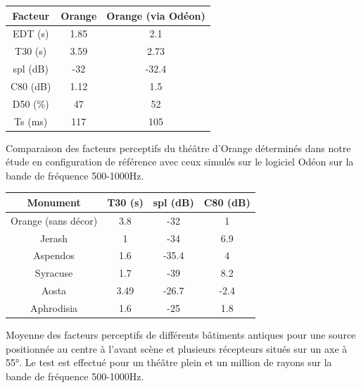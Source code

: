 %
\begin{tableth}
 \begin{tabular}{| *{3}{c|}} 
 \hline 
 Facteur & Orange & Orange (via Odéon)   \\ 
 \hline 
 \hline 
  \gls{EDT} (s)& 1.85& 2.1 \\ 
 \hline 
\gls{T30} (s)& 3.59&  2.73\\ 
 \hline 
\gls{spl} (dB) &-32 & -32.4\\ 
 \hline 
\gls{C80} (dB)& 1.12&1.5  \\ 
 \hline 
\gls{D50} (\%)&47 & 52 \\ 
 \hline 
\gls{Ts} (ms)&117 & 105 \\ 
 \hline 
\end{tabular} 
 \caption{Comparaison des facteurs perceptifs du théâtre d'Orange déterminés dans notre étude en configuration de référence avec ceux simulés sur le logiciel Odéon sur la bande de fréquence 500-1000Hz.}
 \label{tab_rindel} 
 \end{tableth}
 
 \begin{tableth}
 \begin{tabular}{| *{4}{c|}} 
 \hline 
 Monument & \gls{T30} (s) & \gls{spl} (dB) & \gls{C80} (dB)  \\ 
 \hline 
 \hline 
Orange (sans décor) & 3.8  & -32   &  1      \\ 
  \hline
Jerash & 1  & -34 & 6.9  \\ 
  \hline 
Aspendos & 1.6 & -35.4  & 4  \\ 
 \hline 
Syracuse & 1.7  & -39  & 8.2  \\ 
 \hline 
Aosta & 3.49  & -26.7  & -2.4     \\
 \hline 
Aphrodisia & 1.6  & -25  & 1.8     \\ 
 \hline 
\end{tabular} 
 \caption{Moyenne des facteurs perceptifs de différents bâtiments antiques pour une source positionnée au centre à l'avant scène et plusieurs récepteurs situés sur un axe à 55°. Le test est effectué pour un théâtre plein et un million de rayons sur la bande de fréquence 500-1000Hz.}
 \label{tab_rindel2} 
 \end{tableth}

